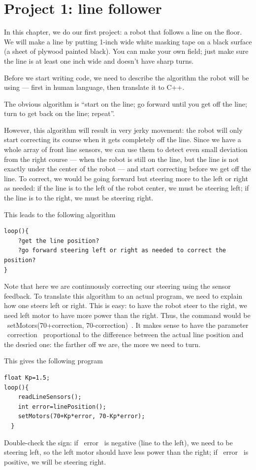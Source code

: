 \documentclass[oneside]{stml-l}
\numberwithin{figure}{chapter}
\begin{document}
\chapter{Project 1: line follower}
In this chapter, we do our first project: a robot that
follows a line on the floor. We will make a line by putting 1-inch wide
white masking tape on a black surface (a sheet of plywood painted black).
You can make your own field; just make sure the line is at least one inch
wide and doesn't have sharp turns.

Before we start writing code, we need to describe the algorithm the robot
will be using --- first in human language, then translate it to C++.  

The obvious algorithm is ``start on the line; go forward until you get off
the line; turn to get back on the
line; repeat''. 

However, this algorithm will result in very jerky movement: the robot 
will only start correcting its course when it gets completely off the line. 
Since we have a whole array of front line sensors, we can use them 
to detect even small deviation from the right course --- when the robot is still
on the line, but the line is not exactly under the center of the robot --- and start
correcting before we get off the line. To correct, we would be going forward but 
steering more to the left or right as needed: if the line is to the left of the robot 
center, we must be steering left; if the line is to the right, we must be steering right.  

This leads to the following algorithm 
\begin{lstlisting}
loop(){
    ?get the line position? 
    ?go forward steering left or right as needed to correct the position?
}
\end{lstlisting}

Note that here we are continuously correcting our steering using the sensor 
feedback.  To translate this algorithm to an actual program, we need to 
explain how one steers left or right.  This is easy: to have the robot
steer to the right, we need left motor to have more power than the right. 
Thus, the command would be ~setMotors(70+correction, 70-correction)~. 
It makes sense to have the parameter ~correction~  proportional to the 
difference between the actual line position and the desried one: the 
farther off we are,  the more we need to turn.  

This gives the following program 
\begin{lstlisting}
float Kp=1.5;
loop(){
    readLineSensors();
    int error=linePosition();
    setMotors(70+Kp*error, 70-Kp*error);
  }
\end{lstlisting}
Double-check the sign: if ~error~ is negative (line to the left), we need to 
be steering left, so the left motor should have less  power than the right; 
if ~error~ is positive, we will be steering right. 
\end{document}
